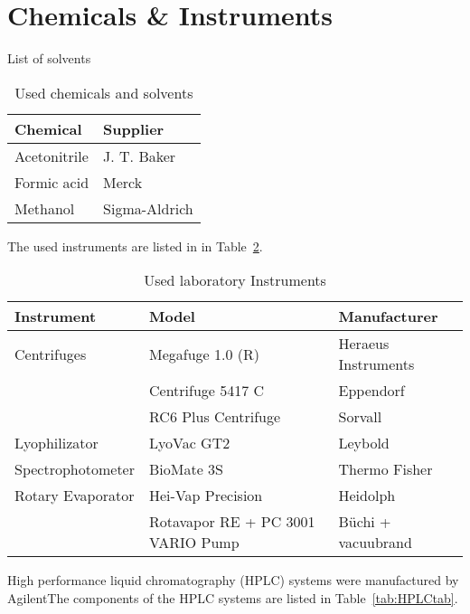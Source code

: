 
\section{Chemicals \& Instruments} %
\label{sec:chemicals_&_instruments}

	List of solvents

	\begin{table}
		\caption{Used chemicals and solvents}
		\label{chemicals}
		\centering
		\begin{tabularx}{\textwidth}{XX}
			\toprule
			\textbf{Chemical}	&	\textbf{Supplier}	\\
			\midrule
			Acetonitrile		&	J. T. Baker			\\
			Formic acid			&	Merck				\\
			Methanol			&	Sigma-Aldrich		\\
		\end{tabularx}
	\end{table}

	The used instruments are listed in in Table~\ref{tab:labins}.

	\begin{table}[H]
		\caption{Used laboratory Instruments}
		\label{tab:labins}
		\centering
		\begin{tabularx}{\textwidth}{XXX}
			\toprule
			\textbf{Instrument}			& \textbf{Model}		& \textbf{Manufacturer}	\\
			\midrule
			Centrifuges			&	Megafuge 1.0 (R)		&	Heraeus Instruments 	\\
								&	Centrifuge 5417 C 		&	Eppendorf	\\
								&	RC6 Plus Centrifuge 	&	Sorvall	\\
			Lyophilizator		&	LyoVac GT2				&	Leybold \\
			Spectrophotometer	&	BioMate 3S				&	Thermo Fisher \\
			Rotary Evaporator	&	Hei-Vap Precision		&	Heidolph \\
								&	Rotavapor RE + PC 3001 VARIO Pump	&	B\"uchi + vacuubrand \\

			\bottomrule
		\end{tabularx}
	\end{table}

	High performance liquid chromatography (HPLC) systems were manufactured by AgilentThe components of the HPLC systems are listed in Table~\ref{tab:HPLCtab}.

